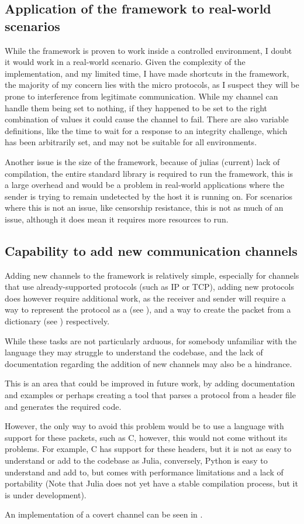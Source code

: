 \subsection{Application of the framework to real-world scenarios}

While the framework is proven to work inside a controlled environment, I doubt it would work in a real-world scenario. Given the complexity of the implementation, and my limited time, I have made shortcuts in the framework, the majority of my concern lies with the micro protocols, as I suspect they will be prone to interference from legitimate communication. While my channel can handle them being set to nothing, if they happened to be set to the right combination of values it could cause the channel to fail. There are also variable definitions, like the time to wait for a response to an integrity challenge, which has been arbitrarily set, and may not be suitable for all environments.

Another issue is the size of the framework, because of julias (current) lack of compilation, the entire standard library is required to run the framework, this is a large overhead and would be a problem in real-world applications where the sender is trying to remain undetected by the host it is running on. For scenarios where this is not an issue, like censorship resistance, this is not as much of an issue, although it does mean it requires more resources to run.


\subsection{Capability to add new communication channels}
\label{sec:new_channels}

Adding new channels to the framework is relatively simple, especially for channels that use already-supported protocols (such as IP or TCP), adding new protocols does however require additional work, as the receiver and sender will require a way to represent the protocol as a  (see ), and a way to create the packet from a dictionary (see ) respectively.

While these tasks are not particularly arduous, for somebody unfamiliar with the language they may struggle to understand the codebase, and the lack of documentation regarding the addition of new channels may also be a hindrance.

This is an area that could be improved in future work, by adding documentation and examples or perhaps creating a tool that parses a protocol from a header file and generates the required code.

However, the only way to avoid this problem would be to use a language with support for these packets, such as C, however, this would not come without its problems. For example, C has support for these headers, but it is not as easy to understand or add to the codebase as Julia, conversely, Python is easy to understand and add to, but comes with performance limitations and a lack of portability (Note that Julia does not yet have a stable compilation process, but it is under development).

An implementation of a covert channel can be seen in .